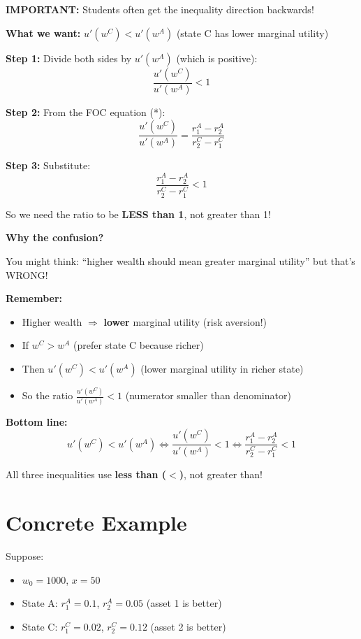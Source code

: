 \documentclass[12pt]{article}
\begin{document}
\begin{center}
\colorbox{red!20}{
\begin{minipage}{0.9\textwidth}
\textbf{IMPORTANT:} Students often get the inequality direction backwards!
\end{minipage}
}
\end{center}

\textbf{What we want:} $u'(w^C) < u'(w^A)$ (state C has lower marginal utility)

\textbf{Step 1:} Divide both sides by $u'(w^A)$ (which is positive):
$$\frac{u'(w^C)}{u'(w^A)} < 1$$

\textbf{Step 2:} From the FOC equation (*):
$$\frac{u'(w^C)}{u'(w^A)} = \frac{r_1^A - r_2^A}{r_2^C - r_1^C}$$

\textbf{Step 3:} Substitute:
$$\frac{r_1^A - r_2^A}{r_2^C - r_1^C} < 1$$

So we need the ratio to be \textbf{LESS than 1}, not greater than 1!

\textbf{Why the confusion?}

You might think: ``higher wealth should mean greater marginal utility'' but that's WRONG!

\textbf{Remember:}
\begin{itemize}
    \item Higher wealth $\Rightarrow$ \textbf{lower} marginal utility (risk aversion!)
    \item If $w^C > w^A$ (prefer state C because richer)
    \item Then $u'(w^C) < u'(w^A)$ (lower marginal utility in richer state)
    \item So the ratio $\frac{u'(w^C)}{u'(w^A)} < 1$ (numerator smaller than denominator)
\end{itemize}

\textbf{Bottom line:}
$$u'(w^C) < u'(w^A) \iff \frac{u'(w^C)}{u'(w^A)} < 1 \iff \frac{r_1^A - r_2^A}{r_2^C - r_1^C} < 1$$

All three inequalities use \textbf{less than ($<$)}, not greater than!

\newpage

\section*{Concrete Example}

Suppose:
\begin{itemize}
    \item $w_0 = 1000$, $x = 50$
    \item State A: $r_1^A = 0.1$, $r_2^A = 0.05$ (asset 1 is better)
    \item State C: $r_1^C = 0.02$, $r_2^C = 0.12$ (asset 2 is better)
\end{itemize}
\end{document}
